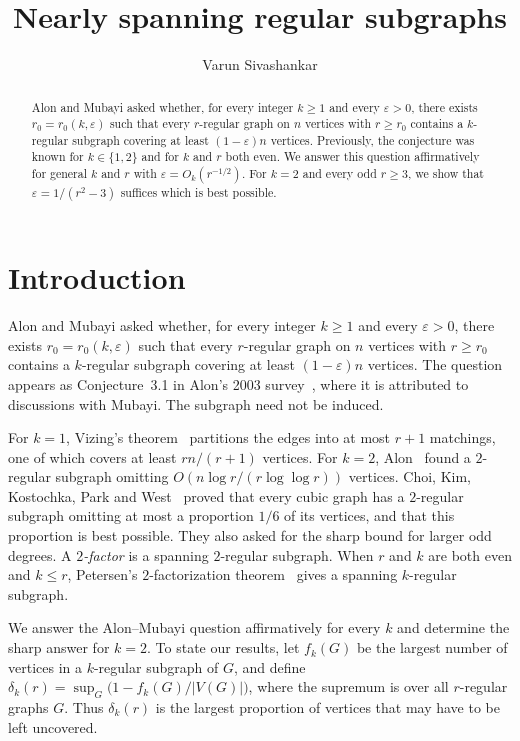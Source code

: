 \documentclass[11pt]{amsart}
\title{Nearly spanning regular subgraphs}
\author{Varun Sivashankar}
\date{}
\theoremstyle{remark}
\begin{document}
\begin{abstract}

Alon and Mubayi asked whether, for every integer $k\ge1$ and every $\varepsilon>0$, there exists $r_0=r_0(k,\varepsilon)$ such that every $r$-regular graph on $n$ vertices with $r\ge r_0$ contains a $k$-regular subgraph covering at least $(1-\varepsilon)n$ vertices. Previously, the conjecture was known for $k\in\{1,2\}$ and for $k$ and $r$ both even. We answer this question affirmatively for general $k$ and $r$ with $\varepsilon=O_k(r^{-1/2})$. For $k=2$ and every odd $r\ge3$, we show that $\varepsilon=1/(r^2-3)$ suffices which is best possible.

\end{abstract}

\maketitle
\section{Introduction}

Alon and Mubayi asked whether, for every integer $k\ge1$ and every $\varepsilon>0$, there exists $r_0=r_0(k,\varepsilon)$ such that every $r$-regular graph on $n$ vertices with $r\ge r_0$ contains a $k$-regular subgraph covering at least $(1-\varepsilon)n$ vertices. The question appears as Conjecture~3.1 in Alon's 2003 survey~\cite{Alon2003}, where it is attributed to discussions with Mubayi. The subgraph need not be induced.

For $k=1$, Vizing's theorem~\cite{Vizing1964} partitions the edges into at most $r+1$ matchings, one of which covers at least $rn/(r+1)$ vertices. For $k=2$, Alon~\cite[Theorem~3.2]{Alon2003} found a $2$-regular subgraph omitting $O(n\log r/(r\log\log r))$ vertices. Choi, Kim, Kostochka, Park and West~\cite{CKKPW2019} proved that every cubic graph has a $2$-regular subgraph omitting at most a proportion $1/6$ of its vertices, and that this proportion is best possible. They also asked for the sharp bound for larger odd degrees. A \emph{$2$-factor} is a spanning $2$-regular subgraph. When $r$ and $k$ are both even and $k\le r$, Petersen's $2$-factorization theorem~\cite{Petersen1891} gives a spanning $k$-regular subgraph.

We answer the Alon--Mubayi question affirmatively for every $k$ and determine the sharp answer for $k=2$. To state our results, let $f_k(G)$ be the largest number of vertices in a $k$-regular subgraph of $G$, and define $\delta_k(r)=\sup_G\bigl(1-f_k(G)/|V(G)|\bigr)$, where the supremum is over all $r$-regular graphs $G$. Thus $\delta_k(r)$ is the largest proportion of vertices that may have to be left uncovered.
\end{document}
